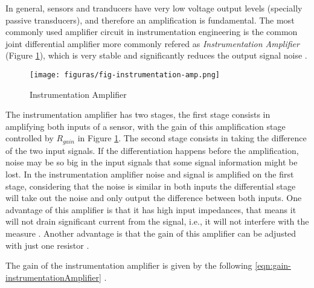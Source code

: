 \begin{comment}
	\begin{equation}
		Vout =  \left( 1 + \frac{R_{f}}{R_{g}} \right) \cdot V_{in}
	\end{equation}\label{eqn-gain-neg-closed-loop-amp}

		The disadvantage of this OpAmp configuration is that only gains greater than one are achievable, in electronic instrumentation this is not a common issue because in this field of electronic engineering amplification is usually done to increase the resolution of signals, not to reduce it.

	\subsubsection{The Instrumentation Amplifier}\label{sssec:instrumentation-amplifier}
\end{comment}

	In general, sensors and tranducers have very low voltage output levels (specially passive transducers), and therefore an amplification is fundamental. The most commonly used amplifier circuit in instrumentation engineering is the common joint differential amplifier more commonly refered as \textit{Instrumentation Amplifier} (Figure \ref{fig:instrumentation-amplifier}), which is very stable and significantly reduces the output signal noise \cite{wait1975introduction}.

	\begin{figure}[htbp]
		\centering
			\texttt{[image: figuras/fig-instrumentation-amp.png]}
		\caption{Instrumentation Amplifier \cite{3opamp}}
		\label{fig:instrumentation-amplifier}
	\end{figure}

	The instrumentation amplifier has two stages, the first stage consists in amplifying both inputs of a sensor, with the gain of this amplification stage controlled by $R_{gain}$ in Figure \ref{fig:instrumentation-amplifier}. The second stage consists in taking the difference of the two input signals. If the differentiation happens before the amplification, noise may be so big in the input signals that some signal information might be lost. In the instrumentation amplifier noise and signal is amplified on the first stage, considering that the noise is similar in both inputs the differential stage will take out the noise and only output the difference between both inputs. One advantage of this amplifier is that it has high input impedances, that means it will not drain significant current from the signal, i.e., it will not interfere with the measure \cite{thomsen2003application}. Another advantage is that the gain of this amplifier can be adjusted with just one resistor \cite{mettingvanrijn1994amplifiers}.
	\par
	The gain of the instrumentation amplifier is given by the following \ref{eqn:gain-instrumentationAmplifier} \cite{analogDevDesignersGuide}.

